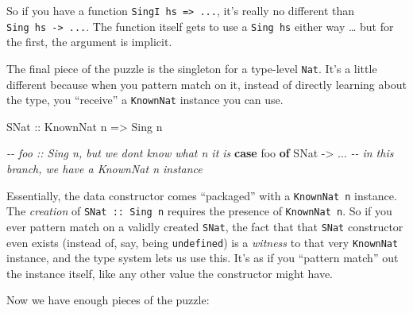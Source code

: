 \documentclass[]{article}
\newenvironment{Shaded}{}{}
\newcommand{\CommentTok}[1]{\textcolor[rgb]{0.38,0.63,0.69}{\textit{#1}}}
\newcommand{\DataTypeTok}[1]{\textcolor[rgb]{0.56,0.13,0.00}{#1}}
\newcommand{\KeywordTok}[1]{\textcolor[rgb]{0.00,0.44,0.13}{\textbf{#1}}}
\newcommand{\NormalTok}[1]{#1}
\newcommand{\OperatorTok}[1]{\textcolor[rgb]{0.40,0.40,0.40}{#1}}
\newcommand{\OtherTok}[1]{\textcolor[rgb]{0.00,0.44,0.13}{#1}}
\begin{document}
So if you have a function \texttt{SingI\ hs\ =\textgreater{}\ ...}, it's really
no different than \texttt{Sing\ hs\ -\textgreater{}\ ...}. The function itself
gets to use a \texttt{Sing\ hs} either way \ldots{} but for the first, the
argument is implicit.

The final piece of the puzzle is the singleton for a type-level \texttt{Nat}.
It's a little different because when you pattern match on it, instead of
directly learning about the type, you ``receive'' a \texttt{KnownNat} instance
you can use.

\begin{Shaded}
\begin{Highlighting}[]
\DataTypeTok{SNat}\OtherTok{ ::} \DataTypeTok{KnownNat}\NormalTok{ n }\OtherTok{=\textgreater{}} \DataTypeTok{Sing}\NormalTok{ n}
\end{Highlighting}
\end{Shaded}

\begin{Shaded}
\begin{Highlighting}[]
\CommentTok{{-}{-} \textasciigrave{}foo :: Sing n\textasciigrave{}, but we don\textquotesingle{}t know what \textasciigrave{}n\textasciigrave{} it is}
\KeywordTok{case}\NormalTok{ foo }\KeywordTok{of}
  \DataTypeTok{SNat} \OtherTok{{-}\textgreater{}} \OperatorTok{...}   \CommentTok{{-}{-} in this branch, we have a \textasciigrave{}KnownNat n\textasciigrave{} instance}
\end{Highlighting}
\end{Shaded}

Essentially, the data constructor comes ``packaged'' with a \texttt{KnownNat\ n}
instance. The \emph{creation} of \texttt{SNat\ ::\ Sing\ n} requires the
presence of \texttt{KnownNat\ n}. So if you ever pattern match on a validly
created \texttt{SNat}, the fact that that \texttt{SNat} constructor even exists
(instead of, say, being \texttt{undefined}) is a \emph{witness} to that very
\texttt{KnownNat} instance, and the type system lets us use this. It's as if you
``pattern match'' out the instance itself, like any other value the constructor
might have.

Now we have enough pieces of the puzzle:
\end{document}
